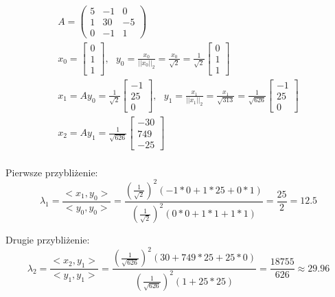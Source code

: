 \documentclass[12pt]{article}
\begin{document}
    \begin{gather*}
        A = \begin{pmatrix}
                5 & -1 & 0\\
                1 & 30 & -5\\
                0 & -1 & 1
        \end{pmatrix}\\
        x_0 = \begin{bmatrix}
                  0 \\
                  1 \\
                  1
        \end{bmatrix}, ~~~
        y_0 = \frac{x_0}{||x_0||_2} = \frac{x_0}{\sqrt{2}} = \frac{1}{\sqrt{2}}
        \begin{bmatrix}
            0 \\
            1 \\
            1
        \end{bmatrix}\\
        x_1 = Ay_0 = \frac{1}{\sqrt{2}}
        \begin{bmatrix}
            -1 \\
            25 \\
            0
        \end{bmatrix}, ~~~
        y_1 = \frac{x_1}{||x_1||_2} = \frac{x_1}{\sqrt{313}} = \frac{1}{\sqrt{626}}
        \begin{bmatrix}
            -1 \\
            25 \\
            0
        \end{bmatrix}\\
        x_2 = Ay_1 = \frac{1}{\sqrt{626}}
        \begin{bmatrix}
            -30 \\
            749 \\
            -25
        \end{bmatrix}\\
    \end{gather*}

    Pierwsze przybliżenie:
    \[\lambda_1 = \frac{<x_1, y_0>}{<y_0, y_0>} = \frac{(\frac{1}{\sqrt{2}})^2 (-1*0 + 1*25 + 0*1)}
    {(\frac{1}{\sqrt{2}})^2 (0*0 + 1*1 + 1*1)} = \frac{25}{2} = 12.5\]

    Drugie przybliżenie:
    \[\lambda_2 = \frac{<x_2, y_1>}{<y_1, y_1>} = \frac{(\frac{1}{\sqrt{626}})^2 (30 + 749*25 + 25*0)}
    {(\frac{1}{\sqrt{626}})^2 (1 + 25*25)} = \frac{18755}{626} \approx 29.96\]
\end{document}
